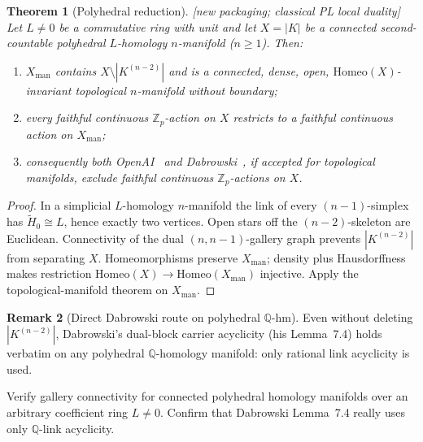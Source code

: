 \documentclass[11pt]{article}
\newtheorem{theorem}{Theorem}[section]
\theoremstyle{definition}
\newtheorem{remark}[theorem]{Remark}
\newcommand{\status}[1]{\textit{\textcolor{black!70}{[#1]}}}
\begin{document}
\begin{theorem}[Polyhedral reduction]
\label{thm:C}
\status{new packaging; classical PL local duality}
Let $L\neq 0$ be a commutative ring with unit and let $X=|K|$ be a connected
second-countable polyhedral $L$-homology $n$-manifold ($n\ge 1$).  Then:
\begin{enumerate}[label=(\roman*)]
\item $X_{\mathrm{man}}$ contains $X\setminus|K^{(n-2)}|$ and is a connected,
dense, open, $\mathrm{Homeo}(X)$-invariant topological $n$-manifold without
boundary;
\item every faithful continuous $\mathbb{Z}_p$-action on $X$ restricts to a
faithful continuous action on $X_{\mathrm{man}}$;
\item consequently both OpenAI~\cite{openai2026} and Dabrowski~\cite{dabrowski2026},
if accepted for topological manifolds, exclude faithful continuous
$\mathbb{Z}_p$-actions on $X$.
\end{enumerate}
\end{theorem}

\begin{proof}
In a simplicial $L$-homology $n$-manifold the link of every $(n-1)$-simplex
has $\tilde{H}_0\cong L$, hence exactly two vertices.  Open stars off the
$(n-2)$-skeleton are Euclidean.  Connectivity of the dual
$(n,n-1)$-gallery graph prevents $|K^{(n-2)}|$ from separating $X$.
Homeomorphisms preserve $X_{\mathrm{man}}$; density plus Hausdorffness makes
restriction $\mathrm{Homeo}(X)\to\mathrm{Homeo}(X_{\mathrm{man}})$ injective.
Apply the topological-manifold theorem on $X_{\mathrm{man}}$.
\end{proof}

\begin{remark}[Direct Dabrowski route on polyhedral $\mathbb{Q}$-hm]
Even without deleting $|K^{(n-2)}|$, Dabrowski's dual-block carrier acyclicity
(his Lemma~7.4) holds verbatim on any polyhedral $\mathbb{Q}$-homology
manifold: only rational link acyclicity is used.
\end{remark}

\begin{checkboxenv}
Verify gallery connectivity for connected polyhedral homology manifolds over
an arbitrary coefficient ring $L\neq 0$.  Confirm that Dabrowski Lemma~7.4
really uses only $\mathbb{Q}$-link acyclicity.
\end{checkboxenv}
\end{document}
